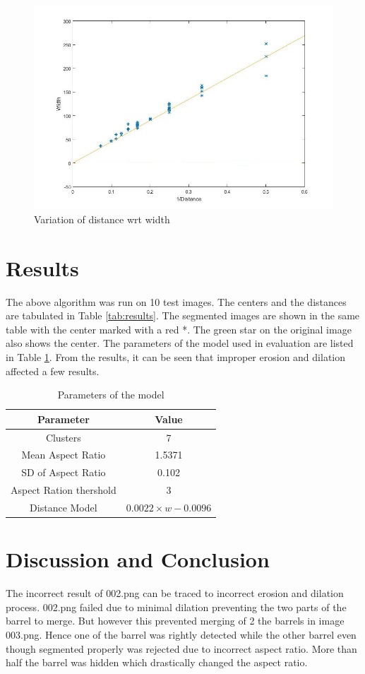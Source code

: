 \documentclass[fleqn,10pt]{SelfArx} %
\begin{document}
\begin{figure}[ht]
\centering
\includegraphics[scale=0.35]{graph2.jpg}
\caption{Variation of distance wrt width}
\label{fig:dist_graph}
\end{figure}

\section{Results}
The above algorithm was run on 10 test images. The centers and the distances are tabulated in Table \ref{tab:results}. The segmented images are shown in the same table with the center marked with a red *. The green star on the original image also shows the center. The parameters of the model used in evaluation are listed in Table \ref{tab:parameters}. From the results, it can be seen that improper erosion and dilation affected a few results. 

\begin{table}[t]
\caption{Parameters of the model}
\centering
\begin{tabular}{cc}
\toprule
Parameter & Value \\ 
\midrule
Clusters & 7 \\ 
Mean Aspect Ratio & 1.5371 \\ 
SD of Aspect Ratio & 0.102 \\ 
Aspect Ration thershold & 3 \\ 
Distance Model & $0.0022\times w-0.0096$ \\ 
\bottomrule
\end{tabular} 
\label{tab:parameters}
\end{table}

\section{Discussion and Conclusion}
The incorrect result of 002.png can be traced to incorrect erosion and dilation process. 002.png failed due to minimal dilation preventing the two parts of the barrel to merge. But however this prevented merging of 2 the barrels in image 003.png. Hence one of the barrel was rightly detected while the other barrel even though segmented properly was rejected due to incorrect aspect ratio. More than half the barrel was hidden which drastically changed the aspect ratio. 
\end{document}

